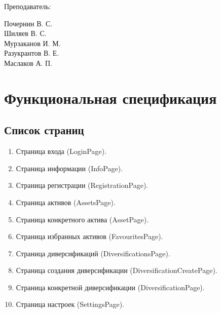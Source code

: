 \documentclass[a4paper, 14pt]{article}
\begin{document}
\begin{titlepage}
\begin{multicols}{2}
\begin{flushright}
            {Преподаватель:\\}

        \end{flushright}
        \begin{flushright}

            {Почернин В. С.}\\
            {Шиляев В. С.}\\
            {Мурзаканов И. М.}\\
            {Разукрантов В. Е.}\\[0.5cm]


            Маслаков А. П.\\

        \end{flushright}
    \end{multicols}

    \flushright{
        {\phantom{qwe}}\\[0.5cm]
    }

    \vfill
\end{titlepage}

\Large
\tableofcontents
\newpage
\large

\section{Функциональная спецификация}

\subsection{Список страниц}

\begin{enumerate}
    \item Страница входа (LoginPage).
    \item Страница информации (InfoPage).
    \item Страница регистрации (RegistrationPage).
    \item Страница активов (AssetsPage).
    \item Страница конкретного актива (AssetPage).
    \item Страница избранных активов (FavouritesPage).
    \item Страница диверсификаций (DiversificationsPage).
    \item Страница создания диверсификации (DiversificationCreatePage).
    \item Страница конкретной диверсификации (DiversificationPage).
    \item Страница настроек (SettingsPage).
\end{enumerate}
\end{document}
